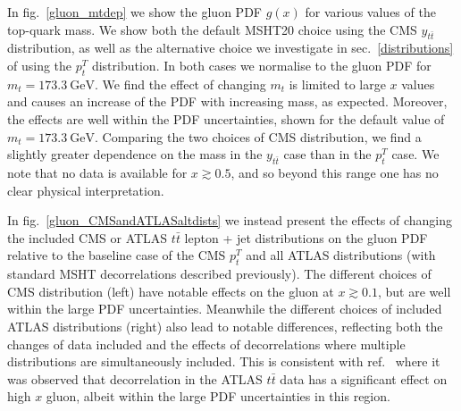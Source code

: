 \documentclass[sn-mathphys]{sn-jnl}%
\newcommand{\pT}{p^T_t}
\newcommand{\ytt}{y_{t\bar{t}}}
\newcommand{\mt}{m_t}
\newcommand{\gev}{\mathrm{GeV}}
\begin{document}
In fig.~\ref{gluon_mtdep} we show the gluon PDF $g(x)$ for various values of the top-quark mass. We show both the default MSHT20 choice using the CMS $\ytt$ distribution, as well as the alternative choice we investigate in sec.~\ref{distributions} of using the $\pT$ distribution. In both cases we normalise to the gluon PDF for $\mt=173.3~\gev$. We find the effect of changing $\mt$ is limited to large $x$ values and causes an increase of the PDF with increasing mass, as expected. Moreover, the effects are well within the PDF uncertainties, shown for the default value of $\mt=173.3~\gev$. Comparing the two choices of CMS distribution, we find a slightly greater dependence on the mass in the $\ytt$ case than in the $\pT$ case. We note that no data is available for $x \gtrsim 0.5$, and so beyond this range one has no clear physical interpretation. 

In fig.~\ref{gluon_CMSandATLASaltdists} we instead present the effects of changing the included CMS or ATLAS $t\bar{t}$ lepton + jet distributions on the gluon PDF relative to the baseline case of the CMS $\pT$ and all ATLAS distributions (with standard MSHT decorrelations described previously). The different choices of CMS distribution (left) have notable effects on the gluon at $x \gtrsim 0.1$, but are well within the large PDF uncertainties. Meanwhile the different choices of included ATLAS distributions (right) also lead to notable differences, reflecting both the changes of data included and the effects of decorrelations where multiple distributions are simultaneously included. This is consistent with ref.~\cite{Bailey:2020ooq} where it was observed that decorrelation in the ATLAS $t\bar{t}$ data has a significant effect on high $x$ gluon, albeit within the large PDF uncertainties in this region. 
\end{document}
